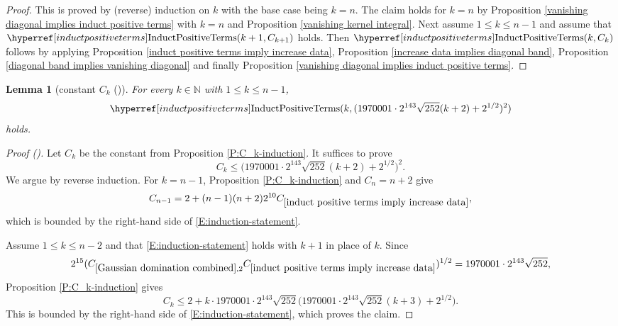 \documentclass[12pt,reqno]{amsart}
\newcommand{\auto}{{({\tiny\faCar})}}
\theoremstyle{plain}
\newtheorem{lemma}[theorem]{Lemma}
\numberwithin{equation}{section}
\theoremstyle{remark}
\newcommand{\using}[1]{}
\newcommand{\N}{{\mathbb N}}
\newcommand{\ls}[1]{{\color{red}{[L: #1]}}}
\newcommand{\jr}[1]{{\color{orange}{[J: #1]}}}
\begin{document}
\begin{proof}
This is proved by (reverse) induction on $k$ with the base case being $k=n$.
The claim holds for $k=n$ by Proposition \ref{vanishing diagonal implies induct positive terms} with $k=n$ and Proposition \ref{vanishing kernel integral}.
Next assume $1\le k\le n-1$ and assume that $\InductPositiveTerms{k+1,C_{k+1}}$ holds.
Then $\InductPositiveTerms{k,C_k}$
follows by applying Proposition \ref{induct positive terms imply increase data}, Proposition \ref{increase data implies diagonal band}, Proposition \ref{diagonal band implies vanishing diagonal} and finally Proposition \ref{vanishing diagonal implies induct positive terms}.
\end{proof}

\ls{I have improved the constants, so that the final result holds with a constant independent of $n$.}
\jr{Oh, of course, because we only lose $k$ in the $k$th step and this is killed by the square root! So it was there already, I just inefficiently estimated the inducted constant, my bad! Very nice}
\begin{lemma}[constant $C_k$ \auto]\label{P:better-induction}\using{P:C_k-induction}\using{Gaussian domination combined}\using{induct positive terms imply increase data}
For every $k\in\N$ with $1\le k\le n-1$,
\begin{equation}\label{auto:positive-induction-local-bound}
\InductPositiveTerms{k,
(1970001\cdot2^{143}\sqrt{252}(k+2)+2^{1/2})^2}
\end{equation}
holds.
\end{lemma}
\begin{proof}[Proof \auto]
Let $C_k$ be the constant from Proposition \ref{P:C_k-induction}. It suffices to prove
\begin{equation}\label{E:induction-statement}
C_k\le
\bigl(1970001\cdot2^{143}\sqrt{252}(k+2)+2^{1/2}\bigr)^2.
\end{equation}
We argue by reverse induction. For $k=n-1$, Proposition \ref{P:C_k-induction} and $C_n=n+2$ give
\[
C_{n-1}
=2+(n-1)(n+2)2^{10}C_{\ref{induct positive terms imply increase data}},
\]
which is bounded by the right-hand side of \eqref{E:induction-statement}.

Assume $1\le k\le n-2$ and that \eqref{E:induction-statement} holds with $k+1$ in place of $k$. Since
\[
2^{15}(C_{\ref{Gaussian domination combined},2}C_{\ref{induct positive terms imply increase data}})^{1/2}
=1970001\cdot2^{143}\sqrt{252},
\]
Proposition \ref{P:C_k-induction} gives
\[
C_k
\le
2+k\cdot1970001\cdot2^{143}\sqrt{252}
\bigl(1970001\cdot2^{143}\sqrt{252}(k+3)+2^{1/2}\bigr).
\]
This is bounded by the right-hand side of \eqref{E:induction-statement}, which proves the claim.
\end{proof}
\end{document}
